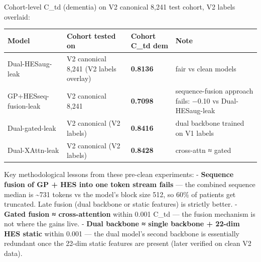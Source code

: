 \documentclass[
  11pt,
]{article}
\newcounter{none} %
\begin{document}
Cohort-level C\_td (dementia) on V2 canonical 8,241 test cohort, V2
labels overlaid:

{\def\LTcaptype{none} %
\begin{longtable}[]{|>{\raggedright\arraybackslash}p{}|>{\raggedright\arraybackslash}p{}|>{\raggedright\arraybackslash}p{}|>{\raggedright\arraybackslash}p{}|}
\hline
\begin{minipage}[b]{\linewidth}\raggedright
Model
\end{minipage} & \begin{minipage}[b]{\linewidth}\raggedright
Cohort tested on
\end{minipage} & \begin{minipage}[b]{\linewidth}\raggedright
Cohort C\_td dem
\end{minipage} & \begin{minipage}[b]{\linewidth}\raggedright
Note
\end{minipage} \\
\hline
\hline
\endhead
\hline
\endlastfoot
Dual-HESaug-leak & V2 canonical 8,241 (V2 labels overlay) &
\textbf{0.8136} & fair vs clean models \\
\hline
GP+HESseq-fusion-leak & V2 canonical 8,241 & \textbf{0.7098} &
sequence-fusion approach fails: −0.10 vs Dual-HESaug-leak \\
\hline
Dual-gated-leak & V2 canonical (V2 labels) & \textbf{0.8416} & dual
backbone trained on V1 labels \\
\hline
Dual-XAttn-leak & V2 canonical (V2 labels) & \textbf{0.8428} &
cross-attn ≈ gated \\
\hline
\end{longtable}
}

Key methodological lessons from these pre-clean experiments: -
\textbf{Sequence fusion of GP + HES into one token stream fails} --- the
combined sequence median is \textasciitilde731 tokens vs the model's
block size 512, so 60\% of patients get truncated. Late fusion (dual
backbone or static features) is strictly better. - \textbf{Gated fusion
≈ cross-attention} within 0.001 C\_td --- the fusion mechanism is not
where the gains live. - \textbf{Dual backbone ≈ single backbone + 22-dim
HES static} within 0.001 --- the dual model's second backbone is
essentially redundant once the 22-dim static features are present (later
verified on clean V2 data).
\end{document}
